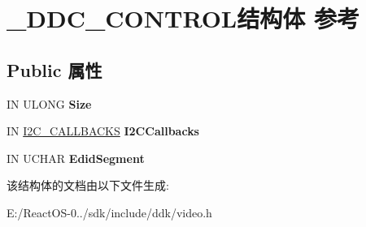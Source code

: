\hypertarget{struct___d_d_c___c_o_n_t_r_o_l}{}\section{\+\_\+\+D\+D\+C\+\_\+\+C\+O\+N\+T\+R\+O\+L结构体 参考}
\label{struct___d_d_c___c_o_n_t_r_o_l}
\subsection*{Public 属性}
\begin{DoxyCompactItemize}
\item 
\mbox{\label{struct___d_d_c___c_o_n_t_r_o_l_a80e56f7554372633c7a45ce8dcd0dc4d}} 
IN U\+L\+O\+NG {\bfseries Size}
\item 
\mbox{\label{struct___d_d_c___c_o_n_t_r_o_l_a98b7f22f9c75c00cc0bb49e87b3ca102}} 
IN \hyperlink{struct___i2_c___c_a_l_l_b_a_c_k_s}{I2\+C\+\_\+\+C\+A\+L\+L\+B\+A\+C\+KS} {\bfseries I2\+C\+Callbacks}
\item 
\mbox{\label{struct___d_d_c___c_o_n_t_r_o_l_a2a86e478a097f949111d93c78d098984}} 
IN U\+C\+H\+AR {\bfseries Edid\+Segment}
\end{DoxyCompactItemize}


该结构体的文档由以下文件生成\+:\begin{DoxyCompactItemize}
\item 
E\+:/\+React\+O\+S-\/0../sdk/include/ddk/video.\+h\end{DoxyCompactItemize}
